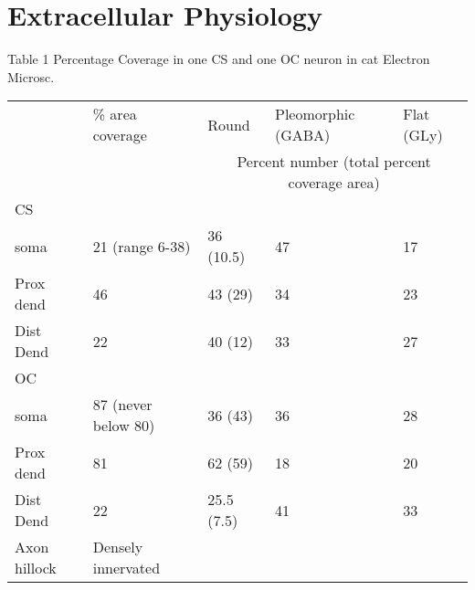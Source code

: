 \documentclass[10pt,a4paper]{article}
\begin{document}
\section{ Extracellular  Physiology}

\begin{landscape}
{\small{}}  
\end{landscape}


Table 1 \citep{SmithRhode:1989} Percentage Coverage in one CS and one OC neuron
in cat Electron Microsc.

\begin{flushleft}
  \begin{tabularx}{\textwidth}{XXXXX}
\toprule
                              &  \% area coverage   &           Round            & Pleomorphic (GABA) & Flat (GLy)   \\
               &                     & \multicolumn{3}{|c|}{Percent number (total percent coverage area)} \\ \midrule
             CS               &                     &  \\
            soma              &   21 (range 6-38)   &         36 (10.5)          &     47      & 17   \\
          Prox dend           &         46          &          43 (29)           &     34      & 23   \\
          Dist Dend           &         22          &          40 (12)           &     33      & 27   \\ \midrule
             OC               &                     &                            &             & \\
            soma              & 87 (never below 80) &          36 (43)           &     36      & 28   \\
          Prox dend           &         81          & 62                    (59) &     18      & 20   \\
          Dist Dend           &         22          &         25.5 (7.5)         &     41      & 33   \\
Axon                  hillock & Densely innervated  &                            &             & \\
\bottomrule
\end{tabularx}
\end{flushleft}

\subsection{\citep{JosephsonMorest:1998}}
\end{document}
